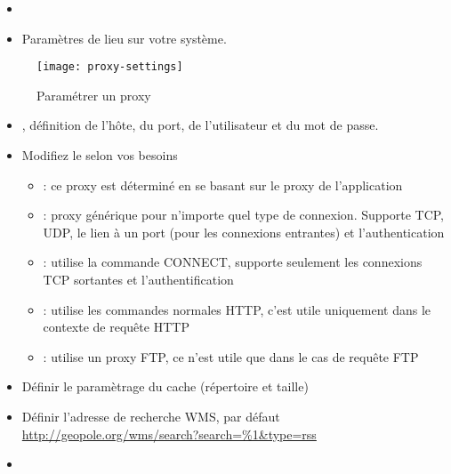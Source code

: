 
\begin{itemize}[label=--]
\item {}
\item Paramètres de lieu sur votre système.
\end{itemize}


\begin{figure}[ht]
   \begin{center}
   \texttt{[image: proxy-settings]}
   \caption{Paramétrer un proxy \nixcaption}
   \label{fig:proxy-settings}
\end{center}
\end{figure}

{\setlength{\baselineskip}{1.4\baselineskip}
\begin{itemize}[label=--]
\item {}, définition de l'hôte, du port, de l'utilisateur et du mot de passe.
\item Modifiez le  selon vos besoins
 \begin{itemize}[label=--,itemsep=2pt]
  \item {}: ce proxy est déterminé en se basant sur le proxy de l'application
  \item {}: proxy générique pour n'importe quel type de connexion. Supporte TCP, UDP, le lien à un port (pour les connexions entrantes) et l'authentication
  \item {}: utilise la commande CONNECT, supporte seulement les connexions TCP sortantes et l'authentification
  \item {}: utilise les commandes normales HTTP, c'est utile uniquement dans le contexte de requête HTTP
  \item {}: utilise un proxy FTP, ce n'est utile que dans le cas de requête FTP
\end{itemize}
\item Définir le paramètrage du cache (répertoire et taille)
\item Définir l'adresse de recherche WMS, par défaut \url{http://geopole.org/wms/search?search=\%1\&type=rss}
\item {}
\end{itemize}}

